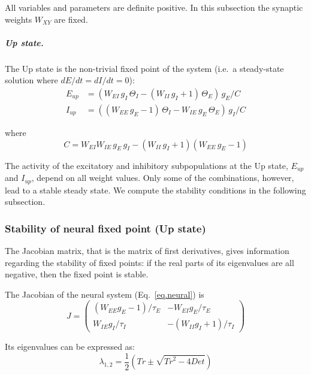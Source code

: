 \documentclass[twocolumn]{article}
\newcommand{\EE}{\mathit{EE}}
\newcommand{\EI}{\mathit{EI}}
\newcommand{\IE}{\mathit{IE}}
\newcommand{\II}{\mathit{II}}
\newcommand{\up}{\mathit{up}}
\newcommand{\De}{\mathit{Det}}
\newcommand{\Tr}{\mathit{Tr}}
\begin{document}
\noindent All variables and parameters are definite positive. In this subsection the synaptic weights $W_{\mathit{XY}}$ are fixed.

\subparagraph{Up state.} The Up state is the non-trivial fixed point of the system (i.e.\ a steady-state solution where $dE/dt=dI/dt=0$):
\begin{equation}
\begin{aligned}
E_{\up} & = (W_{\EI} \, g_I \, \Theta_I - (W_{\II} \, g_I + 1) \, \Theta_E) \, g_E / C \\
I_{\up} & = ((W_{\EE} \, g_E - 1) \, \Theta_I - W_{\IE} \, g_E \, \Theta_E) \, g_I / C
\end{aligned}
\label{eq.upstate_orig}
\end{equation}

\noindent where
\begin{equation}
C = W_{\EI} W_{\IE} \, g_E\, g_I - (W_{\II} \, g_I + 1)(W_{\EE} \, g_E - 1)
\label{eq.den}
\end{equation}

The activity of the excitatory and inhibitory subpopulations at the Up state, $E_{\up}$ and $I_{\up}$, depend on all weight values. Only some of the combinations, however, lead to a stable steady state. We compute the stability conditions in the following subsection.


\subsubsection{Stability of neural fixed point (Up state)}

The Jacobian matrix, that is the matrix of first derivatives, gives information regarding the stability of fixed points: if the real parts of its eigenvalues are all negative, then the fixed point is stable.

The Jacobian of the neural system (Eq.\ \ref{eq.neural}) is
\begin{equation}
J = \left(\begin{array}{rr}
(W_{\EE} g_E - 1)/\tau_E & -W_{\EI} g_E/\tau_E \\
W_{\IE} g_I/\tau_I & -(W_{\II} g_I + 1)/\tau_I
\end{array}\right)
\end{equation}

\noindent Its eigenvalues can be expressed as:
\begin{equation}
\lambda_{1,2} = \frac{1}{2}\left(\Tr \pm \sqrt{\Tr^2 - 4\De} \right)
\label{eq.neural.eigvals}
\end{equation}
\end{document}
